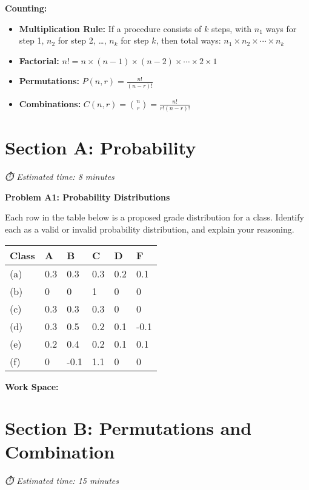 \documentclass[
  11pt,
]{article}
\begin{document}
\textbf{Counting:}

\begin{itemize}
\item
  \textbf{Multiplication Rule:} If a procedure consists of \(k\) steps,
  with \(n_1\) ways for step 1, \(n_2\) for step 2, \ldots, \(n_k\) for
  step \(k\), then total ways:
  \(n_1 \times n_2 \times \cdots \times n_k\)
\item
  \textbf{Factorial:}
  \(n! = n \times (n-1) \times (n-2) \times \cdots \times 2 \times 1\)
\item
  \textbf{Permutations:} \(P(n,r) = \frac{n!}{(n-r)!}\)
\item
  \textbf{Combinations:} \(C(n,r) = \binom{n}{r} = \frac{n!}{r!(n-r)!}\)
\end{itemize}

\section{Section A: Probability}\label{section-a-probability}

\emph{⏱️ Estimated time: 8 minutes}

\textbf{Problem A1: Probability Distributions}

Each row in the table below is a proposed grade distribution for a
class. Identify each as a valid or invalid probability distribution, and
explain your reasoning.

\begin{longtable}[]{@{}llllll@{}}
\toprule\noalign{}
Class & A & B & C & D & F \\
\midrule\noalign{}
\endhead
\bottomrule\noalign{}
\endlastfoot
(a) & 0.3 & 0.3 & 0.3 & 0.2 & 0.1 \\
(b) & 0 & 0 & 1 & 0 & 0 \\
(c) & 0.3 & 0.3 & 0.3 & 0 & 0 \\
(d) & 0.3 & 0.5 & 0.2 & 0.1 & -0.1 \\
(e) & 0.2 & 0.4 & 0.2 & 0.1 & 0.1 \\
(f) & 0 & -0.1 & 1.1 & 0 & 0 \\
\end{longtable}

\textbf{Work Space:}

\section{Section B: Permutations and
Combination}\label{section-b-permutations-and-combination}

\emph{⏱️ Estimated time: 15 minutes}
\end{document}
